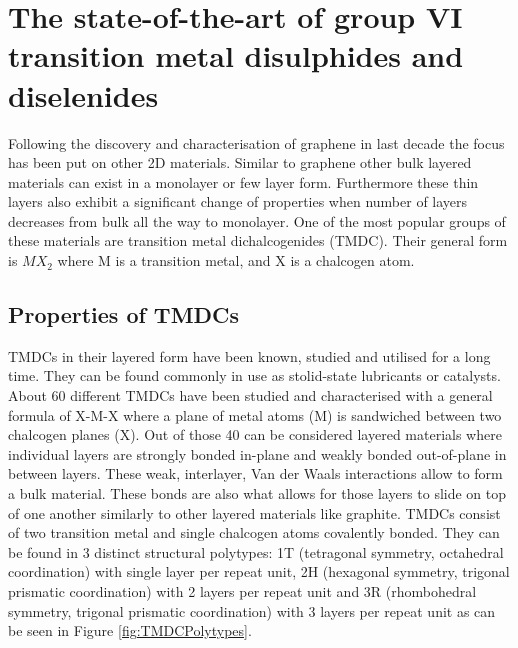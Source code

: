 \chapter{The state-of-the-art of group VI transition metal disulphides and diselenides}
\label{sec:Introduction}
	Following the discovery and characterisation of graphene in last decade the focus has been put on other 2D materials. Similar to graphene other bulk layered materials can exist in a monolayer or few layer form. Furthermore these thin layers also exhibit a significant change of properties when number of layers decreases from bulk all the way to monolayer. One of the most popular groups of these materials are transition metal dichalcogenides (TMDC). Their general form is $MX_2$ where M is a transition metal, and X is a chalcogen atom.  

\section{Properties of TMDCs}
	TMDCs in their layered form have been known, studied and utilised for a long time. They can be found commonly in use as stolid-state lubricants or catalysts. About 60 different TMDCs have been studied and characterised with a general formula of X-M-X where a plane of metal atoms (M) is sandwiched between two chalcogen planes (X). Out of those 40 can be considered layered materials where individual layers are strongly bonded in-plane and weakly bonded out-of-plane in between layers. These weak, interlayer, Van der Waals interactions allow to form a bulk material. These bonds are also what allows for those layers to slide on top of one another similarly to other layered materials like graphite. 
	TMDCs consist of two transition metal and single chalcogen atoms covalently bonded. They can be found in 3 distinct structural polytypes: 1T (tetragonal symmetry, octahedral coordination) with single layer per repeat unit, 2H (hexagonal symmetry, trigonal prismatic coordination) with 2 layers per repeat unit and 3R (rhombohedral symmetry, trigonal prismatic coordination) with 3 layers per repeat unit \cite{ElectronicsAndOptoelectronicsOfTwo-dimensionalTransitionMetalDichalcogenides} as can be seen in Figure \ref{fig:TMDCPolytypes}.
	
